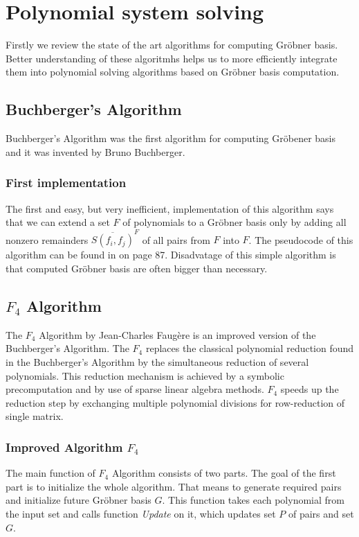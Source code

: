 \chapter{Polynomial system solving}
Firstly we review the state of the art algorithms for computing Gr\"obner basis. Better understanding of these algoritmhs helps us to more efficiently integrate them into polynomial solving algorithms based on Gr\"obner basis computation.

\section{Buchberger's Algorithm}
Buchberger's Algorithm was the first algorithm for computing Gr\"obener basis and it was invented by Bruno Buchberger.

\subsection{First implementation}
The first and easy, but very inefficient, implementation of this algorithm says that we can extend a set $F$ of polynomials to a Gr\"obner basis only by adding all nonzero remainders $\overline{S(f_i, f_j)}^F$ of all pairs from $F$ into $F$.  The pseudocode of this algorithm can be found in \cite{Cox-Little-Shea97} on page 87. Disadvatage of this simple algorithm is that computed Gr\"obner basis are often bigger than necessary.

\section{$F_4$ Algorithm}
The $F_4$ Algorithm \cite{F4} by Jean-Charles Faug\`ere is an improved version of the Buchberger's Algorithm. The $F_4$ replaces the classical polynomial reduction found in the Buchberger's Algorithm by the simultaneous reduction of several polynomials. This reduction mechanism is achieved by a symbolic precomputation and by use of sparse linear algebra methods. $F_4$  speeds up the reduction step by exchanging multiple polynomial divisions for row-reduction of single matrix.

\subsection{Improved Algorithm $F_4$}
The main function of $F_4$ Algorithm consists of two parts. The goal of the first part is to initialize the whole algorithm. That means to generate required pairs and initialize future Gr\"obner basis $G$. This function takes each polynomial from the input set and calls function \textit{Update} on it, which updates set $P$ of pairs and set $G$.

